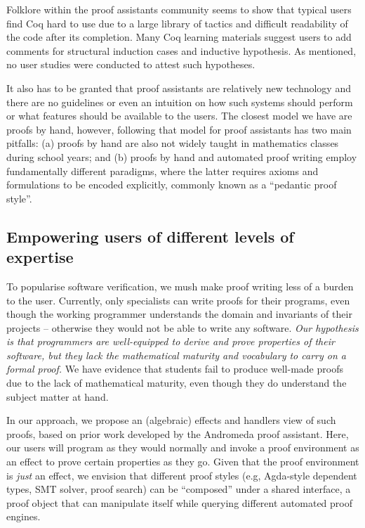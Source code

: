 \documentclass[acmsmall]{acmart}
\begin{document}
Folklore within the proof assistants community seems to show that typical users
find Coq hard to use due to a large library of tactics and difficult readability
of the code after its completion. Many Coq learning materials suggest users to
add comments for structural induction cases and inductive hypothesis. As
mentioned, no user studies were conducted to attest such hypotheses.

It also has to be granted that proof assistants are relatively new technology
and there are no guidelines or even an intuition on how such systems should
perform or what features should be available to the users. The closest model we
have are proofs by hand, however, following that model for proof assistants has
two main pitfalls: (a) proofs by hand are also not widely taught in mathematics
classes during school years; and (b) proofs by hand and automated proof
writing employ fundamentally different paradigms, where the latter requires
axioms and formulations to be encoded explicitly, commonly known as a ``pedantic
proof style''.

\subsection{Empowering users of different levels of expertise}

To popularise software verification, we mush make proof writing less of a
burden to the user. Currently, only specialists can write proofs for their
programs, even though the working programmer understands the domain and
invariants of their projects -- otherwise they would not be able to write any
software. \textit{Our hypothesis is that programmers are well-equipped to derive and
prove properties of their software, but they lack the mathematical maturity and
vocabulary to carry on a formal proof. } We have evidence that students fail to
produce well-made proofs due to the lack of mathematical maturity, even though
they do understand the subject matter at hand.

In our approach, we propose an (algebraic) effects and handlers view of such
proofs, based on prior work developed by the Andromeda proof assistant. Here,
our users will program as they would normally and invoke
a proof environment as an effect to prove certain properties as they go. Given
that the proof environment is \textit{just} an effect, we envision that different proof
styles (e.g, Agda-style dependent types, SMT solver, proof search) can be ``composed''
under a shared interface, a proof object that can manipulate itself while
querying different automated proof engines.
\end{document}
